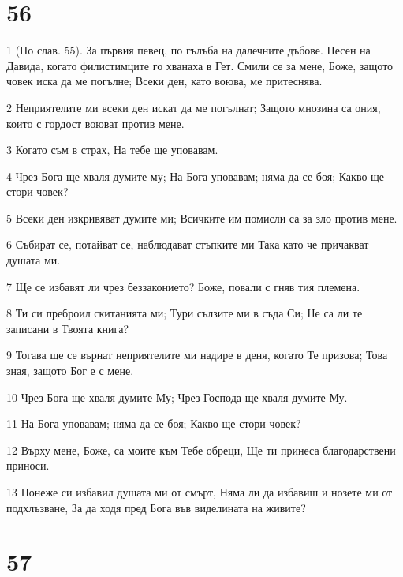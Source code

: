 \chapter{56}

\par 1 (По слав. 55). За първия певец, по гълъба на далечните дъбове. Песен на Давида, когато филистимците го хванаха в Гет. Смили се за мене, Боже, защото човек иска да ме погълне; Всеки ден, като воюва, ме притеснява.
\par 2 Неприятелите ми всеки ден искат да ме погълнат; Защото мнозина са ония, които с гордост воюват против мене.
\par 3 Когато съм в страх, На тебе ще уповавам.
\par 4 Чрез Бога ще хваля думите му; На Бога уповавам; няма да се боя; Какво ще стори човек?
\par 5 Всеки ден изкривяват думите ми; Всичките им помисли са за зло против мене.
\par 6 Събират се, потайват се, наблюдават стъпките ми Така като че причакват душата ми.
\par 7 Ще се избавят ли чрез беззаконието? Боже, повали с гняв тия племена.
\par 8 Ти си преброил скитанията ми; Тури сълзите ми в съда Си; Не са ли те записани в Твоята книга?
\par 9 Тогава ще се върнат неприятелите ми надире в деня, когато Те призова; Това зная, защото Бог е с мене.
\par 10 Чрез Бога ще хваля думите Му; Чрез Господа ще хваля думите Му.
\par 11 На Бога уповавам; няма да се боя; Какво ще стори човек?
\par 12 Върху мене, Боже, са моите към Тебе обреци, Ще ти принеса благодарствени приноси.
\par 13 Понеже си избавил душата ми от смърт, Няма ли да избавиш и нозете ми от подхлъзване, За да ходя пред Бога във виделината на живите?

\chapter{57}

